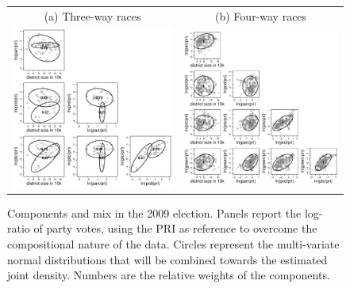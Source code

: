 \documentclass[letter,12pt]{article}
\begin{document}

\begin{figure}
\begin{center}
  \begin{tabular}{cc}
    (a) Three-way races & (b) Four-way races \\
    \includegraphics[width=.45\columnwidth]{linzerLogVot2009-1.pdf} &
    \includegraphics[width=.45\columnwidth]{linzerLogVot2009-2.pdf} 
  \end{tabular}
  \caption{Components and mix in the 2009 election. Panels report the log-ratio of party votes, using the PRI as reference to overcome the compositional nature of the data. Circles represent the multi-variate normal distributions that will be combined towards the estimated joint density. Numbers are the relative weights of the components.}\label{F:linzerLogVot}
\end{center}
\end{figure}
\end{document}
